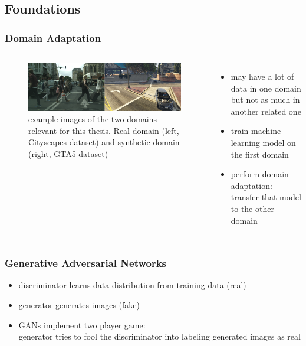 \documentclass{beamer}
\begin{document}
\subsection{Foundations}

\begin{frame}
\frametitle{Domain Adaptation}
\begin{columns}[c]
	\begin{figure}
		\centering
		\includegraphics[width=1.1\textwidth]{../images/DA_examples_cityscapes_gta.png}
		\caption{example images of the two domains relevant for this thesis. Real domain (left, Cityscapes dataset) and synthetic domain (right, GTA5 dataset)}
	\end{figure}
	\begin{itemize}
		\item may have a lot of data in one domain but not as much in another related one
		\item train machine learning model on the first domain
		\item perform domain adaptation: transfer that model to the other domain
	\end{itemize}
\end{columns}
\end{frame}


\begin{frame}
	\frametitle{Generative Adversarial Networks}
	\begin{itemize}
		\item discriminator learns data distribution from training data (real)
		\item generator generates images (fake)
		\item GANs implement two player game:\\
		generator tries to fool the discriminator into labeling generated images as real
	\end{itemize}
\end{frame}
\end{document}
